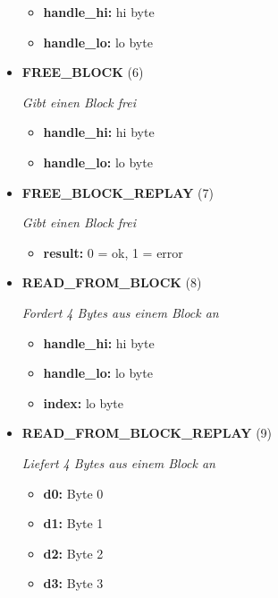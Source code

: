 \begin{itemize}
\small
\begin{itemize}
		
\item \textbf{handle\_hi:} hi byte
\item \textbf{handle\_lo:} lo byte
\end{itemize}
\normalsize
	
\item \textbf{FREE\_BLOCK} (6)

\textit{Gibt einen Block frei}

\small
\begin{itemize}
		
\item \textbf{handle\_hi:} hi byte
\item \textbf{handle\_lo:} lo byte
\end{itemize}
\normalsize
	
\item \textbf{FREE\_BLOCK\_REPLAY} (7)

\textit{Gibt einen Block frei}

\small
\begin{itemize}
		
\item \textbf{result:} 0 = ok, 1 = error
\end{itemize}
\normalsize
	
\item \textbf{READ\_FROM\_BLOCK} (8)

\textit{Fordert 4 Bytes aus einem Block an}

\small
\begin{itemize}
		
\item \textbf{handle\_hi:} hi byte
\item \textbf{handle\_lo:} lo byte
\item \textbf{index:} lo byte
\end{itemize}
\normalsize
	
\item \textbf{READ\_FROM\_BLOCK\_REPLAY} (9)

\textit{Liefert 4 Bytes aus einem Block an}

\small
\begin{itemize}
		
\item \textbf{d0:} Byte 0
\item \textbf{d1:} Byte 1
\item \textbf{d2:} Byte 2
\item \textbf{d3:} Byte 3
\end{itemize}
\normalsize
	

\end{itemize}

